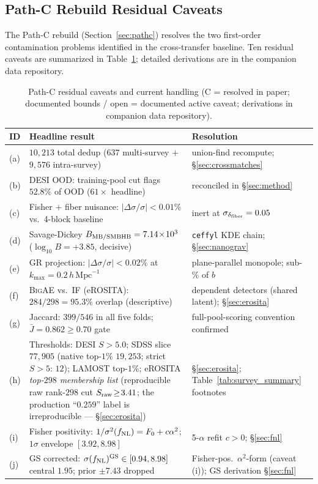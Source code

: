 \documentclass[aps,prd,twocolumn,superscriptaddress,showpacs,preprintnumbers,nofootinbib,longbibliography,floatfix]{revtex4-2}
\newcommand{\sigfnl}{\sigma(f_{\rm NL})}
\newcommand{\BigAE}{\textsc{BigAE}}
\begin{document}
\subsection{Path-C Rebuild Residual Caveats}\label{sec:pathc_caveats}

The Path-C rebuild (Section~\ref{sec:pathc}) resolves the two first-order contamination problems identified in the cross-transfer baseline. Ten residual caveats are summarized in Table~\ref{tab:caveats}; detailed derivations are in the companion data repository.

\begin{table}[tb]
\caption{\label{tab:caveats}Path-C residual caveats and current handling (C = resolved in paper; documented bounds / open = documented active caveat; derivations in companion data repository).}
\begin{ruledtabular}
\begin{tabular}{lll}
ID & Headline result & Resolution \\
\hline
(a) & $10{,}213$ total dedup ($637$ multi-survey $+$ $9{,}576$ intra-survey) & union-find recompute; \S\ref{sec:crossmatches} \\
(b) & DESI OOD: training-pool cut flags $52.8\%$ of OOD ($61\times$ headline) & reconciled in \S\ref{sec:method} \\
(c) & Fisher $+$ fiber nuisance: $|\Delta\sigma/\sigma|<0.01\%$ vs.\ 4-block baseline & inert at $\sigma_{\delta_{\rm fiber}}=0.05$ \\
(d) & Savage-Dickey $B_{\rm MB/SMBHB}=7.14\!\times\!10^3$ ($\log_{10}B=+3.85$, decisive) & \texttt{ceffyl} KDE chain; \S\ref{sec:nanograv} \\
(e) & GR projection: $|\Delta\sigma/\sigma|<0.02\%$ at $k_{\max}=0.2\,h\,\mathrm{Mpc}^{-1}$ & plane-parallel monopole; sub-$\%$ of $b$ \\
(f) & \BigAE{} vs.\ IF (eROSITA): $284/298=95.3\%$ overlap (descriptive) & dependent detectors (shared latent); \S\ref{sec:erosita} \\
(g) & Jaccard: $399/546$ in all five folds; $\bar J=0.862\geq0.70$ gate & full-pool-scoring convention confirmed \\
(h) & \makecell[l]{Thresholds: DESI $S\!>\!5.0$; SDSS slice $77{,}905$ (native top-$1\%$ $19{,}253$;\\ strict $S\!>\!5$: $12$); LAMOST top-$1\%$; eROSITA \emph{top-$298$ membership list}\\ (reproducible raw rank-$298$ cut $S_{\rm raw}\!\geq\!3.41$; the production ``$0.259$''\\ label is irreproducible --- \S\ref{sec:erosita})} & \S\ref{sec:erosita}; Table~\ref{tab:survey_summary} footnotes \\
(i) & Fisher positivity: $1/\sigma^2(f_{\rm NL})=F_0+c\alpha^2$; $1\sigma$ envelope $[3.92,8.98]$ & 5-$\alpha$ refit $c>0$; \S\ref{sec:fnl} \\
(j) & GS corrected: $\sigfnl^{\rm GS}\in[0.94,8.98]$ central $1.95$; prior $\pm7.43$ dropped & Fisher-pos.\ $\alpha^2$-form (caveat (i)); GS derivation \S\ref{sec:fnl} \\
\end{tabular}
\end{ruledtabular}
\end{table}
\end{document}
